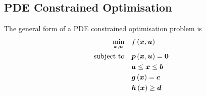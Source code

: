 \subsection{PDE Constrained Optimisation}

The general form of a PDE constrained optimisation problem is
\begin{equation}
  \begin{aligned}
    \min_{\vect{x},\vect{u}} & & & \fnof{f}{\vect{x},\vect{u}} \\
    \text{subject to} & & &\fnof{\vect{p}}{\vect{x},\vect{u}}=\vect{0} \\
    &&& \vect{a}\le\vect{x}\le\vect{b} \\
    & & &\fnof{\vect{g}}{\vect{x}}=\vect{c} \\
    &&& \fnof{\vect{h}}{\vect{x}}\ge\vect{d}
  \end{aligned}
\end{equation}
